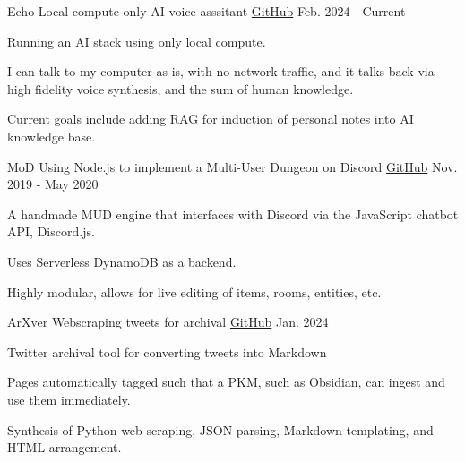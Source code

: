 

\begin{cventries}

\cventry
{Echo} %
{Local-compute-only AI voice asssitant} %
{\href{https://github.com/JohnnySn0w/Echo}{GitHub}} %
{Feb. 2024 - Current} %
{
  \begin{cvitems} %
    \item {Running an AI stack using only local compute.}
    \item {I can talk to my computer as-is, with no network traffic, and it talks back via high fidelity voice synthesis, and the sum of human knowledge.}
    \item {Current goals include adding RAG for induction of personal notes into AI knowledge base.}
  \end{cvitems}
}

\cventry
{MoD} %
{Using Node.js to implement a Multi-User Dungeon on Discord} %
{\href{https://github.com/JohnnySn0w/MoD}{GitHub}} %
{Nov. 2019 - May 2020} %
{
  \begin{cvitems} %
    \item {A handmade MUD engine that interfaces with Discord via the JavaScript chatbot API, Discord.js.}
    \item {Uses Serverless DynamoDB as a backend.}
    \item {Highly modular, allows for live editing of items, rooms, entities, etc.}
  \end{cvitems}
}

\cventry
{ArXver} %
{Webscraping tweets for archival} %
{\href{https://github.com/JohnnySn0w/ArXver}{GitHub}} %
{Jan. 2024} %
{
  \begin{cvitems} %
    \item {Twitter archival tool for converting tweets into Markdown}
    \item {Pages automatically tagged such that a PKM, such as Obsidian, can ingest and use them immediately.}
    \item {Synthesis of Python web scraping, JSON parsing, Markdown templating, and HTML arrangement.}
  \end{cvitems}
}


\end{cventries}
